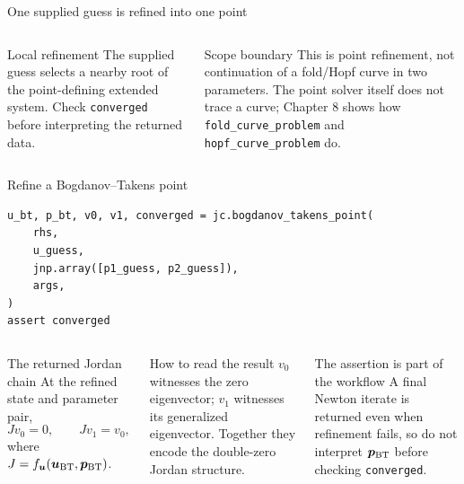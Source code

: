 \begin{frame}{One supplied guess is refined into one point}
\small
\centering
{}
\vspace{3mm}
\begin{columns}[T]
\begin{block}{Local refinement}
The supplied guess selects a nearby root of the point-defining extended
system. Check \texttt{converged} before interpreting the returned data.
\end{block}
\begin{alertblock}{Scope boundary}
This is point refinement, not continuation of a fold/Hopf curve in two
parameters. The point solver itself does not trace a curve; Chapter 8 shows
how \texttt{fold\_curve\_problem} and \texttt{hopf\_curve\_problem} do.
\end{alertblock}
\end{columns}
\end{frame}

\begin{frame}[fragile]{Refine a Bogdanov--Takens point}
\begin{lstlisting}
u_bt, p_bt, v0, v1, converged = jc.bogdanov_takens_point(
    rhs,
    u_guess,
    jnp.array([p1_guess, p2_guess]),
    args,
)
assert converged
\end{lstlisting}
\begin{columns}[T]
\begin{block}{The returned Jordan chain}
At the refined state and parameter pair,
\[
  Jv_0=0,\qquad Jv_1=v_0,
\]
where $J=f_{\bm{u}}(\bm{u}_{\rm BT},\bm p_{\rm BT})$.
\end{block}
\begin{block}{How to read the result}
$v_0$ witnesses the zero eigenvector; $v_1$ witnesses its generalized
eigenvector. Together they encode the double-zero Jordan structure.
\end{block}
\begin{alertblock}{The assertion is part of the workflow}
A final Newton iterate is returned even when refinement fails, so do not
interpret $\bm p_{\rm BT}$ before checking \texttt{converged}.
\end{alertblock}
\end{columns}
\end{frame}

